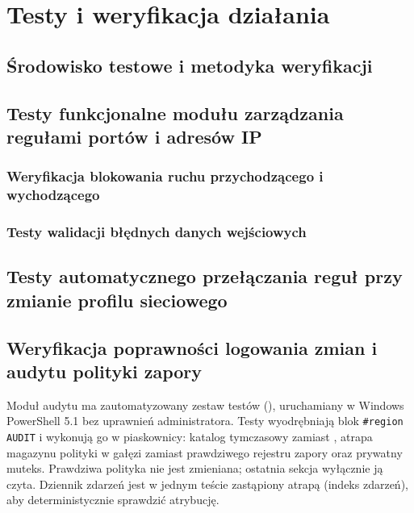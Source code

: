 \chapter{Testy i weryfikacja działania}\label{ch:testy}

\section{Środowisko testowe i metodyka weryfikacji}\label{sec:srodowisko-testowe}

\section{Testy funkcjonalne modułu zarządzania regułami portów i adresów IP}\label{sec:testy-regul}

\subsection{Weryfikacja blokowania ruchu przychodzącego i wychodzącego}\label{subsec:testy-blokowania}

\subsection{Testy walidacji błędnych danych wejściowych}\label{subsec:testy-walidacji}

\section{Testy automatycznego przełączania reguł przy zmianie profilu sieciowego}\label{sec:testy-profili}

\section{Weryfikacja poprawności logowania zmian i audytu polityki zapory}\label{sec:testy-logowania}

Moduł audytu ma zautomatyzowany zestaw testów (), uruchamiany w Windows PowerShell 5.1 bez uprawnień administratora. Testy wyodrębniają blok \texttt{\#region AUDIT} i wykonują go w piaskownicy: katalog tymczasowy zamiast , atrapa magazynu polityki w gałęzi  zamiast prawdziwego rejestru zapory oraz prywatny muteks. Prawdziwa polityka nie jest zmieniana; ostatnia sekcja wyłącznie ją czyta. Dziennik zdarzeń jest w jednym teście zastąpiony atrapą (indeks zdarzeń), aby deterministycznie sprawdzić atrybucję.

